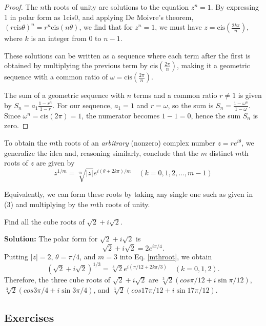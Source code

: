 \documentclass[
	12pt, %
	fleqn, %
	a4paper, %
]{LegrandOrangeBook}
\begin{document}
\begin{proof}
    The \( n \)th roots of unity are solutions to the equation \( z^n = 1 \). By expressing 1 in polar form as \( 1 \text{cis} 0 \), and applying De Moivre's theorem, \( (r \text{cis} \theta)^n = r^n \text{cis} (n\theta) \), we find that for \( z^n = 1 \), we must have \( z = \text{cis} \left(\frac{2k\pi}{n}\right) \), where \( k \) is an integer from \( 0 \) to \( n-1 \).

These solutions can be written as a sequence where each term after the first is obtained by multiplying the previous term by \( \text{cis} \left(\frac{2\pi}{n}\right) \), making it a geometric sequence with a common ratio of \( \omega = \text{cis} \left(\frac{2\pi}{n}\right) \).

The sum of a geometric sequence with \( n \) terms and a common ratio \( r \neq 1 \) is given by \( S_n = a_1 \frac{1-r^n}{1-r} \). For our sequence, \( a_1 = 1 \) and \( r = \omega \), so the sum is \( S_n = \frac{1-\omega^n}{1-\omega} \). Since \( \omega^n = \text{cis} (2\pi) = 1 \), the numerator becomes \( 1-1 = 0 \), hence the sum \( S_n \) is zero.
\end{proof}

To obtain the \( m \)th roots of an \textit{arbitrary} (nonzero) complex number \( z = re^{i\theta} \), we generalize the idea and, reasoning similarly, conclude that the \( m \) distinct \( m \)th roots of \( z \) are given by
\begin{equation}\label{mthroot}
    \boxed{z^{1/m} = \sqrt[m]{|z|}e^{i(\theta+2k\pi)/m} \quad (k = 0, 1, 2, \ldots, m - 1)}
\end{equation}

Equivalently, we can form these roots by taking any single one such as given in (3) and multiplying by the \( m \)th roots of unity.

\begin{example}
    Find all the cube roots of \( \sqrt{2} + i\sqrt{2} \).
\end{example}
\textbf{Solution:}
The polar form for \( \sqrt{2} + i\sqrt{2} \) is
\[
\sqrt{2} + i\sqrt{2} = 2e^{i\pi/4}.
\]
Putting \( |z| = 2 \), \( \theta = \pi/4 \), and \( m = 3 \) into Eq. \ref{mthroot}, we obtain
\[
(\sqrt{2} + i\sqrt{2})^{1/3} = \sqrt[3]{2}e^{i(\pi/12+2k\pi/3)} \quad (k = 0, 1, 2).
\]
Therefore, the three cube roots of \( \sqrt{2} + i\sqrt{2} \) are \( \sqrt[3]{2}(cos \pi/12 + i \sin \pi/12) \), \( \sqrt[3]{2}(cos 3\pi/4 + i \sin 3\pi/4) \), and \( \sqrt[3]{2}(cos 17\pi/12 + i \sin 17\pi/12) \).
\subsection{Exercises}
\end{document}
